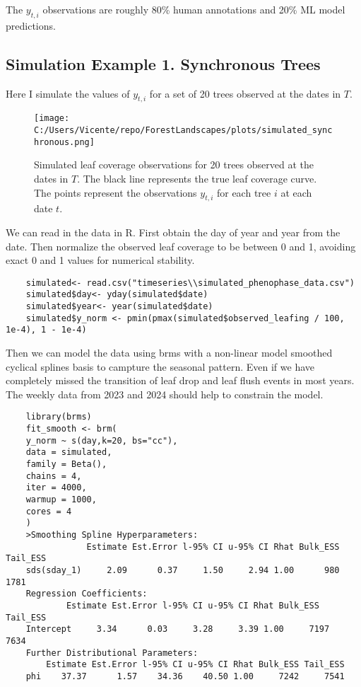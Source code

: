 \documentclass{article}
\begin{document}
The $y_{t, i}$ observations are roughly 80\% human annotations and 20\% ML model predictions.

\subsection{Simulation Example 1. Synchronous Trees}
Here I simulate the values of $y_{t, i}$ for a set of 20 trees observed at the dates in $T$.

\begin{figure}
    \centering
    \texttt{[image: C:/Users/Vicente/repo/ForestLandscapes/plots/simulated\_synchronous.png]}
    \caption{Simulated leaf coverage observations for 20 trees observed at the dates in $T$. The black line represents the true leaf coverage curve. The points represent the observations $y_{t, i}$ for each tree $i$ at each date $t$.}
    \label{fig:interpolation_problem}
\end{figure}

We can read in the data in R. First obtain the day of year and year from the date.
Then normalize the observed leaf coverage to be between 0 and 1, avoiding exact 0 and 1 values for numerical stability.

\begin{verbatim}
    simulated<- read.csv("timeseries\\simulated_phenophase_data.csv")
    simulated$day<- yday(simulated$date)
    simulated$year<- year(simulated$date)
    simulated$y_norm <- pmin(pmax(simulated$observed_leafing / 100, 1e-4), 1 - 1e-4)
\end{verbatim}

Then we can model the data using brms with a non-linear model smoothed cyclical splines basis to campture the seasonal pattern.
Even if we have completely missed the transition of leaf drop and leaf flush events in most years.
The weekly data from 2023 and 2024 should help to constrain the model.

\begin{verbatim}
    library(brms)
    fit_smooth <- brm(
    y_norm ~ s(day,k=20, bs="cc"),
    data = simulated,
    family = Beta(),
    chains = 4,
    iter = 4000,
    warmup = 1000,
    cores = 4
    )
    >Smoothing Spline Hyperparameters:
                Estimate Est.Error l-95% CI u-95% CI Rhat Bulk_ESS Tail_ESS
    sds(sday_1)     2.09      0.37     1.50     2.94 1.00      980     1781
    Regression Coefficients:
            Estimate Est.Error l-95% CI u-95% CI Rhat Bulk_ESS Tail_ESS
    Intercept     3.34      0.03     3.28     3.39 1.00     7197     7634
    Further Distributional Parameters:
        Estimate Est.Error l-95% CI u-95% CI Rhat Bulk_ESS Tail_ESS
    phi    37.37      1.57    34.36    40.50 1.00     7242     7541
\end{verbatim}
\end{document}

